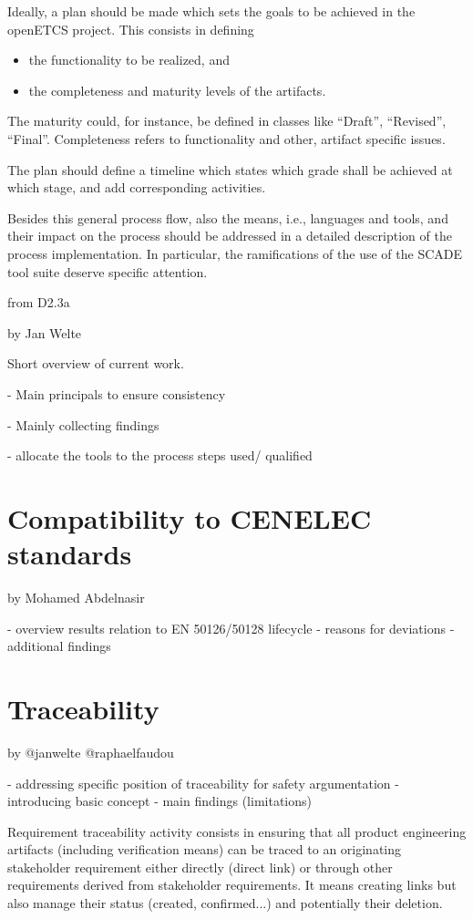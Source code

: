 \documentclass{template/openetcs_report}
\begin{document}
Ideally, a plan should be made which sets the goals to be achieved
in the openETCS project. This consists in defining  
\begin{itemize}
\item the functionality to be realized, and
\item the completeness and maturity levels of the artifacts. 
\end{itemize}
The maturity could, for instance, be defined in classes like
``Draft'', ``Revised'', ``Final''. Completeness refers to
functionality and other, artifact specific issues. 

The plan should define a timeline which states which grade shall be
achieved at which stage, and add corresponding activities.

Besides this general process flow, also the means, i.e., languages and
tools, and their impact on the process should be addressed in a
detailed description of the process implementation. In particular, the
ramifications of the use of the SCADE tool suite deserve specific attention.

from D2.3a

by Jan Welte

Short overview of current work.

- Main principals to ensure consistency 

- Mainly collecting findings

- allocate the tools to the process steps used/ qualified

\section{Compatibility to CENELEC standards}

by Mohamed Abdelnasir

- overview results relation to EN 50126/50128 lifecycle 
- reasons for deviations
- additional findings

\section{Traceability}

by @janwelte @raphaelfaudou

- addressing specific position of traceability for safety argumentation
- introducing basic concept
- main findings (limitations)

Requirement traceability activity consists in ensuring that all product engineering artifacts (including verification means) can be traced to an originating stakeholder requirement either directly (direct link) or through other requirements derived from stakeholder requirements. It means creating links but also manage their status (created, confirmed...) and potentially their deletion.
\end{document}
